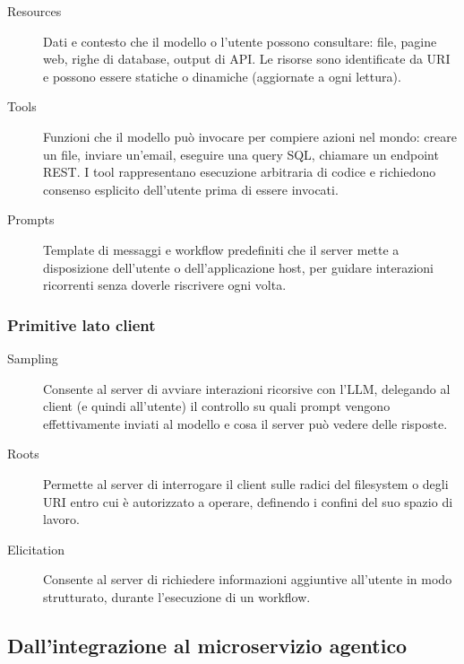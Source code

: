 \begin{description}
  \item[Resources] Dati e contesto che il modello o l'utente possono consultare:
    file, pagine web, righe di database, output di API. Le risorse sono identificate da
    URI e possono essere statiche o dinamiche (aggiornate a ogni lettura).
  \item[Tools] Funzioni che il modello può invocare per compiere azioni nel mondo:
    creare un file, inviare un'email, eseguire una query SQL, chiamare un endpoint REST.
    I tool rappresentano esecuzione arbitraria di codice e richiedono consenso esplicito
    dell'utente prima di essere invocati.
  \item[Prompts] Template di messaggi e workflow predefiniti che il server mette a
    disposizione dell'utente o dell'applicazione host, per guidare interazioni ricorrenti
    senza doverle riscrivere ogni volta.
\end{description}

\subsubsection{Primitive lato client}

\begin{description}
  \item[Sampling] Consente al server di avviare interazioni ricorsive con l'LLM,
    delegando al client (e quindi all'utente) il controllo su quali prompt vengono
    effettivamente inviati al modello e cosa il server può vedere delle risposte.
  \item[Roots] Permette al server di interrogare il client sulle radici del filesystem
    o degli URI entro cui è autorizzato a operare, definendo i confini del suo spazio
    di lavoro.
  \item[Elicitation] Consente al server di richiedere informazioni aggiuntive
    all'utente in modo strutturato, durante l'esecuzione di un workflow.
\end{description}

\subsection{Dall'integrazione al microservizio agentico}
\label{sec:mcp-agentico}

